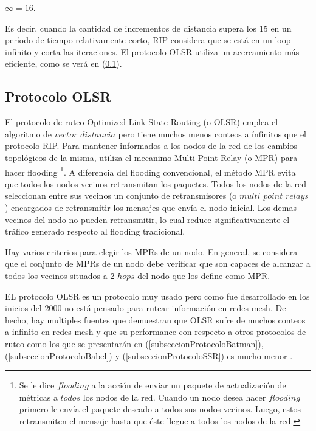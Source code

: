 \begin{center}
$ \infty = 16. $
\end{center}

Es decir, cuando la cantidad de incrementos de distancia supera los 15 en un período de tiempo relativamente corto, RIP considera que se está en un loop infinito y corta las iteraciones. El protocolo OLSR utiliza un acercamiento más eficiente, como se verá en (\ref{subseccionProtocoloOLSR}).


\subsection{Protocolo OLSR}
\label{subseccionProtocoloOLSR}

El protocolo de ruteo Optimized Link State Routing (o OLSR) emplea el algoritmo de $vector$ $distancia$ pero tiene muchos menos conteos a ínfinitos que el protocolo RIP. Para mantener informados a los nodos de la red de los cambios topológicos de la misma, utiliza el mecanimo Multi-Point Relay (o MPR) para hacer flooding \footnote{Se le dice $flooding$ a la acción de enviar un paquete de actualización de métricas a $todos$ los nodos de la red. Cuando un nodo desea hacer $flooding$ primero le envía el paquete deseado a todos sus nodos vecinos. Luego, estos retransmiten el mensaje hasta que éste llegue a todos los nodos de la red.}. A diferencia del flooding convencional, el método MPR evita que todos los nodos vecinos retransmitan los paquetes. Todos los nodos de la red seleccionan entre sus vecinos un conjunto de retransmisores  (o $multi$ $point$ $relays$) encargados de retransmitir los mensajes que envía el nodo inicial. Los demas vecinos del nodo no pueden retransmitir, lo cual reduce significativamente el tráfico generado respecto al flooding tradicional.

Hay varios criterios para elegir los MPRs de un nodo. En general, se considera que el conjunto de MPRs de un nodo debe verificar que son capaces de alcanzar a todos los vecinos situados a 2 $hops$ del nodo que los define como MPR.

EL protocolo OLSR es un protocolo muy usado pero como fue desarrollado en los inicios del 2000 no está pensado para rutear información en redes mesh. De hecho, hay multiples fuentes que demuestran que OLSR sufre de muchos conteos a infinito en redes mesh \cite{PAPERbatman} y que su performance con respecto a otros protocolos de ruteo como los que se presentarán en (\ref{subseccionProtocoloBatman}), (\ref{subseccionProtocoloBabel}) y (\ref{subseccionProtocoloSSR}) es mucho menor \cite{PAPERrealWORLDperformance}.

